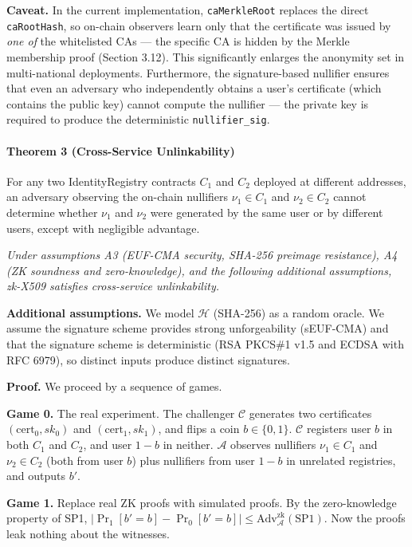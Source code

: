 \documentclass[11pt, a4paper]{article}
\begin{document}
\textbf{Caveat.} In the current implementation, \texttt{caMerkleRoot}
replaces the direct \texttt{caRootHash}, so on-chain observers learn
only that the certificate was issued by \emph{one of} the whitelisted
CAs --- the specific CA is hidden by the Merkle membership proof
(Section 3.12). This significantly enlarges the anonymity set in
multi-national deployments. Furthermore, the signature-based nullifier
ensures that even an adversary who independently obtains a user's
certificate (which contains the public key) cannot compute the nullifier
--- the private key is required to produce the deterministic
\texttt{nullifier\_sig}.

\paragraph{Theorem 3 (Cross-Service Unlinkability)}\label{theorem-3-cross-service-unlinkability} For any two
IdentityRegistry contracts \(C_1\) and \(C_2\) deployed at different
addresses, an adversary observing the on-chain nullifiers
\(\nu_1 \in C_1\) and \(\nu_2 \in C_2\) cannot determine whether
\(\nu_1\) and \(\nu_2\) were generated by the same user or by different
users, except with negligible advantage.

\emph{Under assumptions A3 (EUF-CMA security, SHA-256 preimage
resistance), A4 (ZK soundness and zero-knowledge), and the following
additional assumptions, zk-X509 satisfies cross-service unlinkability.}

\textbf{Additional assumptions.} We model \(\mathcal{H}\) (SHA-256) as a
random oracle. We assume the signature scheme provides strong
unforgeability (sEUF-CMA) and that the signature scheme is deterministic
(RSA PKCS\#1 v1.5 and ECDSA with RFC 6979), so distinct inputs produce
distinct signatures.

\textbf{Proof.} We proceed by a sequence of games.

\textbf{Game 0.} The real experiment. The challenger \(\mathcal{C}\)
generates two certificates \((\text{cert}_0, sk_0)\) and
\((\text{cert}_1, sk_1)\), and flips a coin \(b \in \{0, 1\}\).
\(\mathcal{C}\) registers user \(b\) in both \(C_1\) and \(C_2\), and
user \(1-b\) in neither. \(\mathcal{A}\) observes nullifiers
\(\nu_1 \in C_1\) and \(\nu_2 \in C_2\) (both from user \(b\)) plus
nullifiers from user \(1-b\) in unrelated registries, and outputs
\(b'\).

\textbf{Game 1.} Replace real ZK proofs with simulated proofs. By the
zero-knowledge property of SP1,
\(|\Pr_1[b' = b] - \Pr_0[b' = b]| \leq \text{Adv}_{\mathcal{A}}^{\text{zk}}(\text{SP1})\).
Now the proofs leak nothing about the witnesses.
\end{document}
